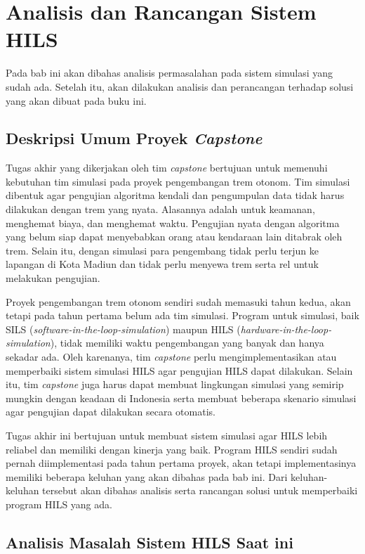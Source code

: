 \chapter{Analisis dan Rancangan Sistem HILS}

Pada bab ini akan dibahas analisis permasalahan pada sistem simulasi yang sudah
ada. Setelah itu, akan dilakukan analisis dan perancangan terhadap solusi yang
akan dibuat pada buku ini.

\section{Deskripsi Umum Proyek \textit{Capstone}}

Tugas akhir yang dikerjakan oleh tim \textit{capstone} bertujuan untuk memenuhi
kebutuhan tim simulasi pada proyek pengembangan trem otonom. Tim simulasi
dibentuk agar pengujian algoritma kendali dan pengumpulan data tidak harus
dilakukan dengan trem yang nyata. Alasannya adalah untuk keamanan, menghemat
biaya, dan menghemat waktu. Pengujian nyata dengan algoritma yang belum siap
dapat menyebabkan orang atau kendaraan lain ditabrak oleh trem. Selain itu,
dengan simulasi para pengembang tidak perlu terjun ke lapangan di Kota Madiun
dan tidak perlu menyewa trem serta rel untuk melakukan pengujian.

Proyek pengembangan trem otonom sendiri sudah memasuki tahun kedua, akan tetapi
pada tahun pertama belum ada tim simulasi. Program untuk simulasi, baik SILS
(\textit{software-in-the-loop-simulation}) maupun HILS
(\textit{hardware-in-the-loop-simulation}), tidak memiliki waktu pengembangan
yang banyak dan hanya sekadar ada. Oleh karenanya, tim \textit{capstone} perlu
mengimplementasikan atau memperbaiki sistem simulasi HILS agar pengujian HILS
dapat  dilakukan. Selain itu, tim \textit{capstone} juga harus dapat membuat
lingkungan simulasi yang semirip mungkin dengan keadaan di Indonesia serta
membuat beberapa skenario simulasi agar pengujian dapat dilakukan secara
otomatis.

Tugas akhir ini bertujuan untuk membuat sistem simulasi agar HILS lebih reliabel
dan memiliki dengan kinerja yang baik. Program HILS sendiri sudah pernah
diimplementasi pada tahun pertama proyek, akan tetapi implementasinya memiliki
beberapa keluhan yang akan dibahas pada bab ini. Dari keluhan-keluhan tersebut
akan dibahas analisis serta rancangan solusi untuk memperbaiki program HILS yang
ada.

\section{Analisis Masalah Sistem HILS Saat ini}


